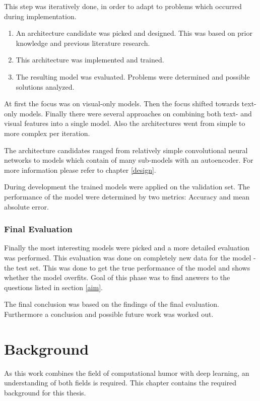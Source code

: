 \documentclass[draft,final,oneside]{vutinfth} %
\begin{document}
This step was iteratively done, in order to adapt to problems which occurred during implementation.

\begin{enumerate}

\item An architecture candidate was picked and designed. This was based on prior knowledge and previous literature research.
\item This architecture was implemented and trained.
\item The resulting model was evaluated. Problems were determined and possible solutions analyzed.

\end{enumerate}

At first the focus was on visual-only models. Then the focus shifted towards text-only models. Finally there were several approaches on combining both text- and visual features into a single model. Also the architectures went from simple to more complex per iteration.

The architecture candidates ranged from relatively simple convolutional neural networks to models which contain of many sub-models with an autoencoder. For more information please refer to chapter \ref{design}.

During development the trained models were applied on the validation set. The performance of the model were determined by two metrics: Accuracy and mean absolute error. 

\subsection{Final Evaluation}

Finally the most interesting models were picked and a more detailed evaluation was performed. This evaluation was done on completely new data for the model - the test set. This was done to get the true performance of the model and shows whether the model overfits. Goal of this phase was to find answers to the questions listed in section \ref{aim}.

The final conclusion was based on the findings of the final evaluation. Furthermore a  conclusion and possible future work was worked out.


\chapter{Background}

As this work combines the field of computational humor with deep learning, an understanding of both fields is required. This chapter contains the required background for this thesis.
\end{document}
